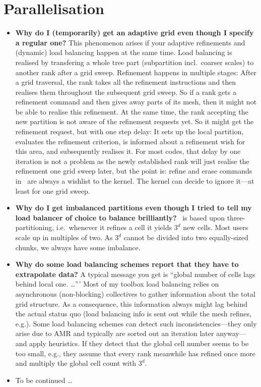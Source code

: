 \section{Parallelisation}

\begin{itemize}
  \item \textbf{Why do I (temporarily) get an adaptive grid even though I
  specify a regular one?}
  This phenomenon arises if your adaptive refinements and (dynamic) load
  balancing happen at the same time. Load balancing is realised by transfering a
  whole tree part (subpartition incl.~coarser scales) to another rank after a
  grid sweep. Refinement happens in multiple stages: After a grid traversal, the
  rank takes all the refinement instructions and then realises them throughout
  the subsequent grid sweep. So if a rank gets a refinement command and then
  gives away parts of its mesh, then it might not be able to realise this 
  refinement. At the same time, the rank accepting the new partition is not
  aware of the refinement requests yet. So it might get the refinement
  request, but with one step delay: It sets up the local partition, evaluates
  the refinement criterion, is informed about a refinement wish for this
  area, and subsequently realises it. For most codes, that delay by one
  iteration is not a problem as the newly established rank will just realise the
  refinement one grid sweep later, but the point is:
  refine and erase commands in \Peano\ are always a wishlist to the kernel. The
  kernel can decide to ignore it---at least for one grid sweep.
  \item \textbf{Why do I get imbalanced partitions even though I tried to tell
  my load balancer of choice to balance brilliantly?}
  \Peano\ is based upon three-partitioning, i.e.~whenever it refines a cell it
  yields $3^d$ new cells. Most users scale up in multiples of two. As $3^d$
  cannot be divided into two equally-sized chunks, we always have some
  imbalance.
  \item \textbf{Why do some load balancing schemes report that they have to
  extrapolate data?} 
  A typical message you get is ``global number of cells lags behind local one.
  \ldots ''' Most of my toolbox load balancing relies on asynchronous
  (non-blocking) collectives to gather information about the total grid
  structure. As a consequence, this information always might lag behind the
  actual status quo (load balancing info is sent out while the mesh refines,
  e.g.). Some load balancing schemes can detect such inconsistencies---they only
  arise due to AMR and typically are sorted out an iteration later anyway---and
  apply heuristics. If they detect that the global cell number seems to be too
  small, e.g., they assume that every rank meanwhile has refined once more and
  multiply the global cell count with $3^d$.
  \item To be continued \dots
\end{itemize}
